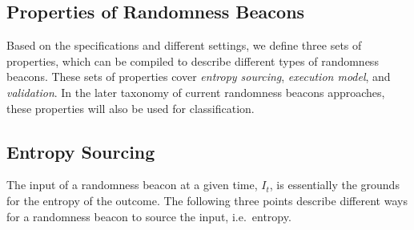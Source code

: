 \subsection{Properties of Randomness Beacons}
Based on the specifications and different settings, we define three sets of properties, which can be compiled to describe different types of randomness beacons.
These sets of properties cover \emph{entropy sourcing}, \emph{execution model}, and \emph{validation}.
In the later taxonomy of current randomness beacons approaches, these properties will also be used for classification.

\subsection{Entropy Sourcing}
The input of a randomness beacon at a given time, $I_t$, is essentially the grounds for the entropy of the outcome.
The following three points describe different ways for a randomness beacon to source the input, i.e.\ entropy.
